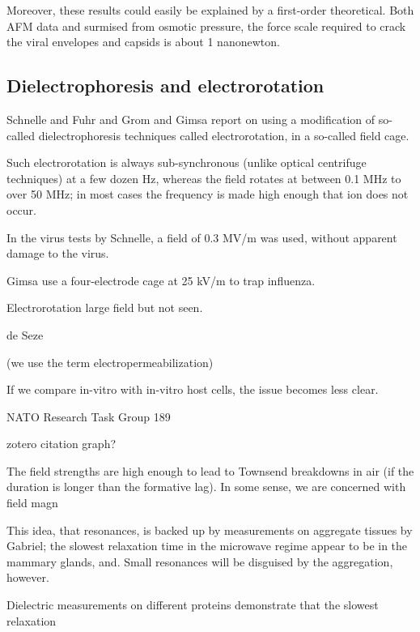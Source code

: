 \documentclass[paper.tex]{subfiles}
\begin{document}
\begin{multicols}{1}
Moreover, these results could easily be explained by a first-order theoretical. Both AFM data and surmised from osmotic pressure, the force scale required to crack the viral envelopes and capsids is about 1 nanonewton. 



\subsection{Dielectrophoresis and electrorotation}

Schnelle\cite{Trapping1996} and Fuhr\cite{Radiofrequency1994} and Grom \cite{Accumulation2006} and Gimsa \cite{New1999} report on using a modification of so-called dielectrophoresis techniques called electrorotation, in a so-called field cage.
 
 
Such electrorotation is always sub-synchronous (unlike optical centrifuge techniques) at a few dozen Hz, whereas the field rotates at between 0.1 MHz to over 50 MHz; in most cases the frequency is made high enough that ion does not occur.

In the virus tests by Schnelle, a field of 0.3 MV/m was used, without apparent damage to the virus.

Gimsa \cite{New1999} use a four-electrode cage at 25 kV/m to trap influenza.

Electrorotation large field but not seen.

de Seze





\pagebreak

(we use the term electropermeabilization)


If we compare in-vitro with in-vitro host cells, the issue becomes less clear.


NATO Research Task Group 189 \cite{treatyelectromagnetic}

zotero citation graph?


The field strengths are high enough to lead to Townsend breakdowns in air (if the duration is longer than the formative lag). In some sense, we are concerned with field magn

This idea, that resonances, is backed up by measurements on aggregate tissues by Gabriel; the slowest relaxation time in the microwave regime appear to be in the mammary glands, and. Small resonances will be disguised by the aggregation, however.


Dielectric measurements on different proteins demonstrate that the slowest relaxation 









\end{multicols}
\end{document}
